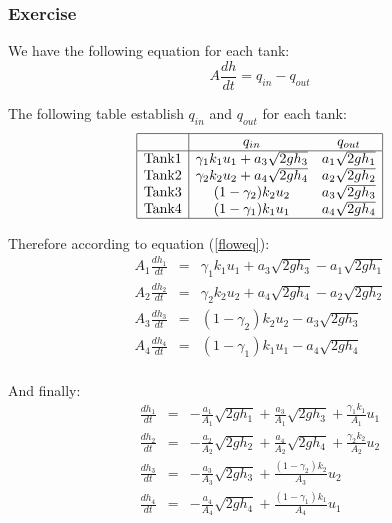 \subsubsection{Exercise} 

We have the following equation for each tank:
\begin{equation}
A \frac{dh}{dt} = q_{in} - q_{out} 
\label{floweq}
\end{equation}

The following table establish $q_{in}$ and $q_{out}$ for each tank:
$$
\begin{array}{|c|cc|}
    \hline
    & q_{in} & q_{out} \\
    \hline
    \text{Tank} 1 & \gamma_1k_1u_1+a_3\sqrt{2gh_3} & a_1\sqrt{2gh_1} \\
    \text{Tank} 2 & \gamma_2k_2u_2+a_4\sqrt{2gh_4} & a_2\sqrt{2gh_2} \\
    \text{Tank} 3 & (1-\gamma_2)k_2u_2 & a_3\sqrt{2gh_3} \\ 
    \text{Tank} 4 & (1-\gamma_1)k_1u_1 & a_4\sqrt{2gh_4} \\ 
    \hline
\end{array}
$$

Therefore according to equation (\ref{floweq}): 
$$
    \begin{array}{rcl}
    A_1 \frac{dh_1}{dt} & = &
        \gamma_1k_1u_1+a_3\sqrt{2gh_3} - a_1\sqrt{2gh_1} \\
    A_2 \frac{dh_2}{dt} & = &
        \gamma_2k_2u_2+a_4\sqrt{2gh_4} - a_2\sqrt{2gh_2} \\
    A_3 \frac{dh_3}{dt} & = &
        (1-\gamma_2)k_2u_2 - a_3\sqrt{2gh_3} \\ 
    A_4 \frac{dh_4}{dt} & = &
    (1-\gamma_1)k_1u_1 - a_4\sqrt{2gh_4} \\ 
    \end{array}
$$

And finally:
\begin{equation}
    \boxed{
        \begin{array}{rcl}
    \frac{dh_1}{dt} & = &
            - \frac{a_1}{A_1}\sqrt{2gh_1} + \frac{a_3}{A_1}\sqrt{2gh_3} + \frac{\gamma_1k_1}{A_1}u_1\\ 

    \frac{dh_2}{dt} & = &
            - \frac{a_2}{A_2}\sqrt{2gh_2} + \frac{a_4}{A_2}\sqrt{2gh_4} + \frac{\gamma_2k_2}{A_2}u_2\\ 

    \frac{dh_3}{dt} & = &
            -\frac{a_3}{A_3}\sqrt{2gh_3}+\frac{(1-\gamma_2)k_2}{A_3}u_2 \\ 

    \frac{dh_4}{dt} & = &
            -\frac{a_4}{A_4}\sqrt{2gh_4}+\frac{(1-\gamma_1)k_1}{A_4}u_1 \\ 
        \end{array}
    \label{tanksyseq}
}
\end{equation}
